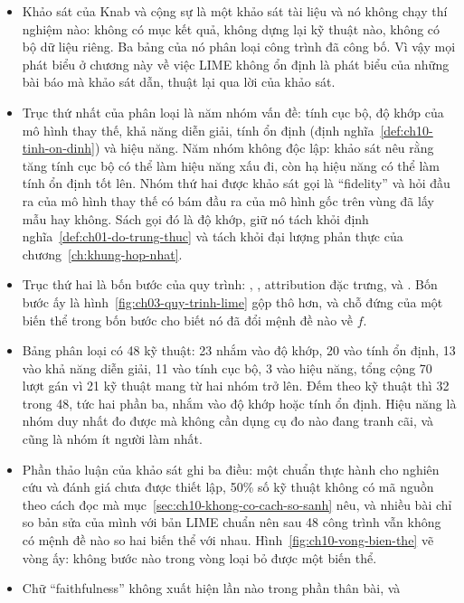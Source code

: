 \begin{tomtat}
\begin{itemize}
  \item Khảo sát của Knab và cộng sự là một khảo sát tài liệu và nó không chạy
  thí nghiệm nào:
  không có mục kết quả, không dựng lại kỹ thuật nào, không có bộ dữ liệu riêng.
  Ba bảng của nó phân loại công trình đã công bố. Vì vậy mọi phát biểu ở chương
  này về việc LIME không ổn định là phát biểu của những bài báo mà khảo sát dẫn,
  thuật lại qua lời của khảo sát.
  \item Trục thứ nhất của phân loại là năm nhóm vấn đề: tính cục bộ, độ khớp của
  mô hình thay thế, khả năng diễn giải, tính ổn định
  (định nghĩa~\ref{def:ch10-tinh-on-dinh}) và hiệu năng. Năm nhóm không độc lập:
  khảo sát nêu rằng tăng tính cục bộ có thể làm hiệu năng xấu đi, còn hạ hiệu
  năng có thể làm tính ổn định tốt lên. Nhóm thứ hai được khảo sát gọi là
  \enquote{fidelity} và hỏi đầu ra của mô hình thay thế có bám đầu ra của mô hình
  gốc trên vùng đã lấy mẫu hay không. Sách gọi đó là độ khớp, giữ nó tách khỏi
  định nghĩa~\ref{def:ch01-do-trung-thuc} và tách khỏi đại lượng phản thực của
  chương~\ref{ch:khung-hop-nhat}.
  \item Trục thứ hai là bốn bước của quy trình: , , attribution đặc trưng, và
  . Bốn bước ấy là
  hình~\ref{fig:ch03-quy-trinh-lime} gộp thô hơn, và chỗ đứng của một biến thể
  trong bốn bước cho biết nó đã đổi mệnh đề nào về $f$.
  \item Bảng phân loại có 48 kỹ thuật: 23 nhắm vào độ khớp, 20 vào tính ổn định,
  13 vào khả năng diễn giải, 11 vào tính cục bộ, 3 vào hiệu năng, tổng cộng 70
  lượt gán vì 21 kỹ thuật mang từ hai nhóm trở lên. Đếm theo kỹ thuật thì 32
  trong 48, tức hai phần ba, nhắm vào độ khớp hoặc tính ổn định. Hiệu năng là
  nhóm duy nhất đo được mà không cần dụng cụ đo nào đang tranh cãi, và cũng là
  nhóm ít người làm nhất.
  \item Phần thảo luận của khảo sát ghi ba điều: một chuẩn thực hành cho nghiên
  cứu và đánh giá chưa được thiết lập, 50\% số kỹ thuật không có mã nguồn theo
  cách đọc mà mục~\ref{sec:ch10-khong-co-cach-so-sanh} nêu, và
  nhiều bài chỉ so bản sửa của mình với bản LIME chuẩn nên sau 48 công
  trình vẫn không có mệnh đề nào so hai biến thể với nhau.
  Hình~\ref{fig:ch10-vong-bien-the} vẽ vòng ấy: không bước nào trong vòng loại
  bỏ được một biến thể.
  \item Chữ \enquote{faithfulness} không xuất hiện lần nào trong phần thân bài, và

\end{itemize}
\end{tomtat}
